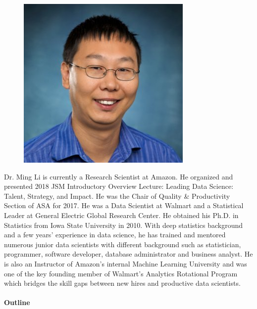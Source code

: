 \documentclass[11pt]{article}
\begin{document}
\begin{figure}
  \vspace{-25pt}
  \begin{center}
    \includegraphics[width=\linewidth]{Ming-Li.png}
  \end{center}  
  \vspace{-25pt}
\end{figure}
Dr. Ming Li is currently a Research Scientist at Amazon.
He organized and presented 2018 JSM
Introductory Overview Lecture: Leading Data Science: Talent, Strategy,
and Impact. He was the Chair of Quality \& Productivity Section of ASA
for 2017. He was a Data Scientist at Walmart and a Statistical Leader
at General Electric Global Research Center. He obtained his Ph.D. in
Statistics from Iowa State University in 2010. With deep statistics
background and a few years’ experience in data science, he has trained
and mentored numerous junior data scientists with different background
such as statistician, programmer, software developer, database
administrator and business analyst. He is also an Instructor of
Amazon’s internal Machine Learning University and was one of the key
founding member of Walmart’s Analytics Rotational Program which
bridges the skill gaps between new hires and productive data
scientists.


\paragraph{Outline}
\end{document}
